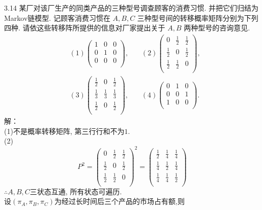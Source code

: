 3.14 某厂对该厂生产的同类产品的三种型号调查顾客的消费习惯. 并把它们归结为Markov链模型. 记顾客消费习惯在 $A, B, C $ 三种型号间的转移概率矩阵分别为下列四种. 请依这些转移阵所提供的信息对厂家提出关于 $A, B$ 两种型号的咨询意见.\\
\[
\begin{split}
&(1)\begin{pmatrix}
	1 & 0 & 0\\
	0 & 1 & 0\\
	0 & 0 & 0\\
	\end{pmatrix},~~~~~~~~
(2)\begin{pmatrix}
	0 & \frac{1}{2} & \frac{1}{2}\\
	\frac{1}{2} & 0 & \frac{1}{2}\\
	\frac{1}{2} & \frac{1}{2} & 0\\
	\end{pmatrix},\\
&(3)\begin{pmatrix}
	\frac{1}{2} & 0 & \frac{1}{2}\\
	\frac{1}{3} & \frac{1}{3} & \frac{1}{3}\\
	\frac{1}{2} & 0 & \frac{1}{2}\\
	\end{pmatrix},~~~~~~~~
(4)\begin{pmatrix}
	0 & 1 & 0\\
	0 & 0 & 1\\
	1 & 0 & 0\\
	\end{pmatrix}.
\end{split}
\]
解：\\
(1)不是概率转移矩阵, 第三行行和不为$1$.\\
(2)
\[
P^2 = 
\begin{pmatrix}
0 & \frac{1}{2} & \frac{1}{2}\\
\frac{1}{2} & 0 & \frac{1}{2}\\
\frac{1}{2} & \frac{1}{2} & 0\\
\end{pmatrix}^2
=
\begin{pmatrix}
\frac{1}{2} & \frac{1}{4} & \frac{1}{4}\\
\frac{1}{4} & \frac{1}{2} & \frac{1}{4}\\
\frac{1}{4} & \frac{1}{4} & \frac{1}{2}\\
\end{pmatrix}
\]
$\therefore A,B,C$三状态互通, 所有状态可遍历.\\
设$(\pi_A,\pi_B,\pi_C)$为经过长时间后三个产品的市场占有额,则
